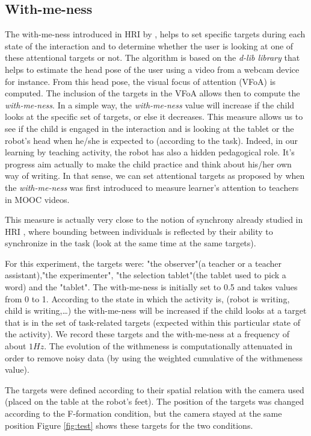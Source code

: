 \documentclass[letterpaper, 10 pt, conference]{ieeeconf}  %
\begin{document}
\subsection{With-me-ness}
The with-me-ness introduced in HRI by \cite{lemaignan2016realtime}, helps to set specific targets during each state of the interaction and to determine whether the user is looking at one of these attentional targets or not.
The algorithm is based on the \textit{d-lib library} that helps to estimate the head pose of the user using a video from a webcam device for instance.
From this head pose, the visual focus of attention (VFoA) is computed.
The inclusion of the targets in the VFoA allows then to compute the \emph{with-me-ness}.
In a simple way, the \emph{with-me-ness} value will increase if the child looks at the specific set of targets, or else it decreases.
This measure allows us to see if the child is engaged in the interaction and is looking at the tablet or the robot's head when he/she is expected to (according to the task).
Indeed, in our learning by teaching activity, the robot has also a hidden pedagogical role. It's progress aim actually to make the child practice and think about his/her own way of writing. 
In that sense, we can set attentional targets as proposed by \cite{sharma2014me} when the \emph{with-me-ness} was first introduced to measure learner's attention to teachers in MOOC videos.

This measure is actually very close to the notion of synchrony already studied in HRI \cite{delaherche2012interpersonal}, where bounding between individuals is reflected by their ability to synchronize in the task (look at the same time at the same targets).

For this experiment, the targets were: "the observer"(a teacher or a teacher assistant),"the experimenter",  "the selection tablet"(the tablet used to pick a word) and the "tablet".
The with-me-ness is initially set to 0.5 and takes values from 0 to 1.
According to the state in which the activity is, (robot is writing, child is writing,\dots) the with-me-ness will be increased if the child looks at a target that is in the set of task-related targets (expected within this particular state of the activity).
We record these targets and the with-me-ness at a frequency of about $1Hz$.
The evolution of the withmeness is computationally attenuated in order to remove noisy data (by using the weighted cumulative of the withmeness value).


The targets were defined according to their spatial relation with the camera used (placed on the table at the robot's feet).
The position of the targets was changed according to the F-formation condition, but the camera stayed at the same position
Figure \ref{fig:test} shows these targets for the two conditions.
\end{document}
